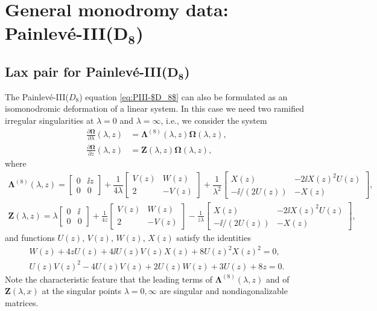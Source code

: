 \section[General monodromy data: Painlev\'e-III(D\_8)]{General monodromy data: Painlev\'e-III($\boldsymbol{D_8}$)} \label{sec:monodromy-rep-$D_8$}

\subsection[Lax pair for Painlev\'e-III(D\_8)]{Lax pair for Painlev\'e-III($\boldsymbol{D_8}$)}
\label{sec:lax-pair-$D_8$}

The Painlev\'e-III($D_8$) equation \eqref{eq:PIII-$D_8$} can also be formulated as an isomonodromic deformation of a linear system. In this case we need two ramified irregular singularities at $\lambda = 0$ and $\lambda = \infty$, i.e., we consider the system
\begin{align}\label{eq:lax_pair_D8}
\frac{\partial\mathbf{\Omega}}{\partial\lambda} (\lambda, z) &= {\mathbf{\Lambda}}^{(8)}(\lambda, z) \mathbf{\Omega}(\lambda, z), \\
\frac{\partial\mathbf{\Omega}}{\partial z} (\lambda, z) &= {\mathbf{Z}}(\lambda, z) \mathbf{\Omega}(\lambda, z),
\label{eq:lax_pair_D8_2}
\end{align}
where
\begin{gather*}
{\mathbf{\Lambda}}^{(8)}(\lambda, z) = \begin{bmatrix}0&{\ii z}{} \\0&0\end{bmatrix} +\dfrac{1}{4\lambda}\begin{bmatrix}V(z) & {W}(z)\\2 & -V(z)\end{bmatrix} + \dfrac{1}{\lambda^2}\begin{bmatrix}X(z) & -2\ii X(z)^2U(z)\\-\ii/(2U(z)) & -X(z)\end{bmatrix},
\\
{\mathbf{Z}}(\lambda, z) = \lambda\begin{bmatrix}0& {\ii} \\0&0\end{bmatrix} + \frac{1}{4z}\begin{bmatrix}V(z) & W(z)\\2 & -V(z)\end{bmatrix} - \frac{1}{z\lambda}\begin{bmatrix}X(z) & -2\ii X(z)^2U(z)\\-\ii/(2U(z)) & -X(z)\end{bmatrix},
\end{gather*}
and functions $U(z)$, $V(z)$, $W(z)$, $X(z)$ satisfy the identities
\begin{gather}
 W(z) +4zU(z) +4\ii U(z)V(z)X(z) + 8 U(z )^2X(z)^2 =0,
 \label{eq:UVWXidentity1}\\
 U(z) V(z)^2-4 U(z) V(z)+2 U(z) W(z)+3 U(z)+8 z=0.\label{eq:UVWidentity1}
\end{gather}
Note the characteristic feature that the leading terms of $\mathbf{\Lambda}^{(8)}(\lambda,z)$ and of $\mathbf{Z}(\lambda,x)$ at the singular points $\lambda=0,\infty$ are singular and nondiagonalizable matrices.

